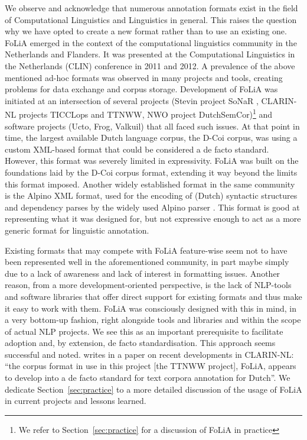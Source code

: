 \documentclass[a4paper,10pt,twoside]{article}
\begin{document}
We observe and acknowledge that numerous annotation formats exist in the field
of Computational Linguistics and Linguistics in general. This raises the
question why we have opted to create a new format rather than to use an
existing one. FoLiA emerged in the context of the computational linguistics
community in the Netherlands and Flanders. It was presented at the
Computational Linguistics in the Netherlands (CLIN) conference in 2011 and
2012. A prevalence of the above mentioned ad-hoc formats was observed in
many projects and tools, creating problems for data exchange and corpus storage.
Development of FoLiA was initiated at an intersection of several projects
(Stevin project SoNaR \cite{StevinSONAR2013}, CLARIN-NL projects TICCLops and
TTNWW, NWO project DutchSemCor)\footnote{We refer to Section~\ref{sec:practice}
for a discussion of FoLiA in practice} and software projects (Ucto, Frog,
Valkuil) that all faced such issues. At that point in time, the largest
available Dutch language corpus, the D-Coi corpus, was using a custom XML-based
format \cite{DCOI} that could be considered a de facto standard.
However, this format was severely limited in expressivity.  FoLiA was built on
the foundations laid by the D-Coi corpus format, extending it way beyond the
limits this format imposed. Another widely established format in the same
community is the Alpino XML format, used for the encoding of (Dutch) syntactic
structures and dependency parses by the widely used Alpino parser
\cite{ALPINO}. This format is good at representing what it was designed for,
but not expressive enough to act as a more generic format for linguistic
annotation.

Existing formats that may compete with FoLiA feature-wise seem not to have been
represented well in the aforementioned community, in part maybe simply due to a
lack of awareness and lack of interest in formatting issues. Another reason,
from a more development-oriented perspective, is the lack of NLP-tools and
software libraries that offer direct support for existing formats and thus make
it easy to work with them. FoLiA was consciously designed with this in mind, in
a very bottom-up fashion, right alongside tools and libraries and within the
scope of actual NLP projects. We see this as an important prerequisite to
facilitate adoption and, by extension, de facto standardisation. This approach
seems successful and noted.  writes in a paper on
recent developments in CLARIN-NL: ``the corpus format in use in this project
[the TTNWW project], FoLiA, appears to develop into a de facto standard for
text corpora annotation for Dutch''. We dedicate Section~\ref{sec:practice} to
a more detailed discussion of the usage of FoLiA in current projects and
lessons learned.
\end{document}
